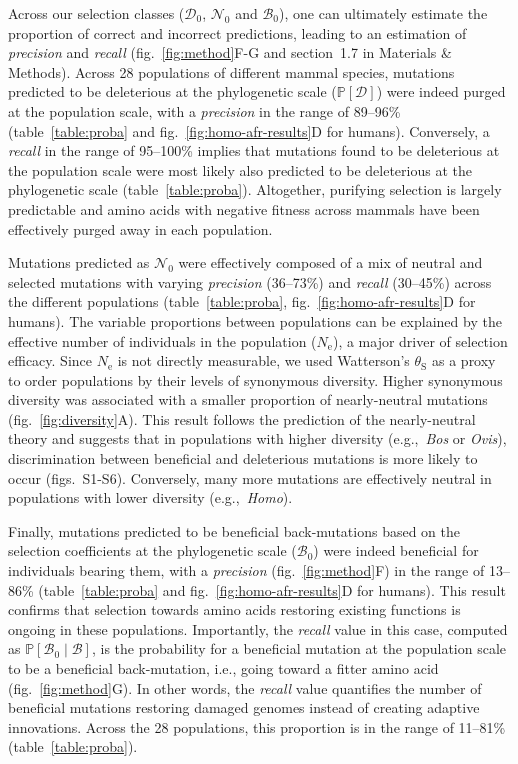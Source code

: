 \documentclass[12pt]{article}
\newcommand{\Ne}{N_{\text{e}}}
\newcommand{\proba}{\mathbb{P}}
\newcommand{\SphyDel}{\mathcal{D}_0}
\newcommand{\SphyNeu}{\mathcal{N}_0}
\newcommand{\SphyBen}{\mathcal{B}_0}
\newcommand{\given}{\mid}
\newcommand{\SpopDel}{\mathcal{D}}
\newcommand{\SpopBen}{\mathcal{B}}
\newcommand{\ProbaPopDel}{\proba [ \SpopDel]}
\newcommand{\thetaSyn}{\theta_{\text{S}}}
\begin{document}
Across our selection classes ($\SphyDel$, $\SphyNeu$ and $\SphyBen$), one can ultimately estimate the proportion of correct and incorrect predictions, leading to an estimation of \textit{precision} and \textit{recall} (fig.~\ref{fig:method}F-G and section~1.7 in Materials \& Methods).
Across 28 populations of different mammal species, mutations predicted to be deleterious at the phylogenetic scale ($\ProbaPopDel$) were indeed purged at the population scale, with a \textit{precision} in the range of 89--96\% (table~\ref{table:proba} and fig.~\ref{fig:homo-afr-results}D for humans).
Conversely, a \textit{recall} in the range of 95--100\% implies that mutations found to be deleterious at the population scale were most likely also predicted to be deleterious at the phylogenetic scale (table~\ref{table:proba}).
Altogether, purifying selection is largely predictable and amino acids with negative fitness across mammals have been effectively purged away in each population.

Mutations predicted as $\SphyNeu$ were effectively composed of a mix of neutral and selected mutations with varying \textit{precision} (36--73\%) and \textit{recall} (30--45\%) across the different populations (table~\ref{table:proba}, fig.~\ref{fig:homo-afr-results}D for humans).
The variable proportions between populations can be explained by the effective number of individuals in the population ($\Ne$), a major driver of selection efficacy.
Since $\Ne$ is not directly measurable, we used Watterson's $\thetaSyn$ as a proxy to order populations by their levels of synonymous diversity.
Higher synonymous diversity was associated with a smaller proportion of nearly-neutral mutations (fig.~\ref{fig:diversity}A).
This result follows the prediction of the nearly-neutral theory and suggests that in populations with higher diversity (e.g.,~\textit{Bos} or \textit{Ovis}), discrimination between beneficial and deleterious mutations is more likely to occur (figs.~S1-S6).
Conversely, many more mutations are effectively neutral in populations with lower diversity (e.g.,~\textit{Homo}).

Finally, mutations predicted to be beneficial back-mutations based on the selection coefficients at the phylogenetic scale ($\SphyBen$) were indeed beneficial for individuals bearing them, with a \textit{precision} (fig.~\ref{fig:method}F) in the range of 13--86\% (table~\ref{table:proba} and fig.~\ref{fig:homo-afr-results}D for humans).
This result confirms that selection towards amino acids restoring existing functions is ongoing in these populations.
Importantly, the \textit{recall} value in this case, computed as $\proba [ \SphyBen  \given  \SpopBen]$, is the probability for a beneficial mutation at the population scale to be a beneficial back-mutation, i.e., going toward a fitter amino acid (fig.~\ref{fig:method}G).
In other words, the \textit{recall} value quantifies the number of beneficial mutations restoring damaged genomes instead of creating adaptive innovations.
Across the 28 populations, this proportion is in the range of 11--81\% (table~\ref{table:proba}).
\end{document}
